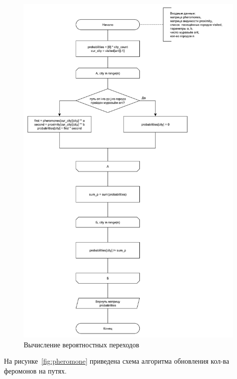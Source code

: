 \begin{figure}
	\centering
	\includegraphics[width=0.85\linewidth]{images/probabilities}
	\caption{Вычисление вероятностных переходов}
	\label{fig:probabilities}
\end{figure}

На рисунке~\ref{fig:pheromone} приведена схема алгоритма обновления кол-ва феромонов на путях.

